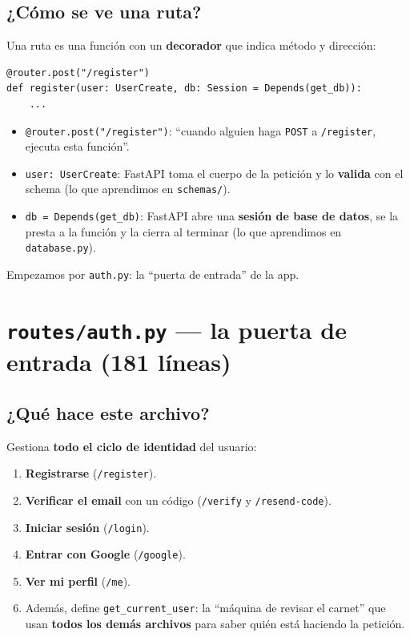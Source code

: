 \documentclass[11pt,a4paper]{article}
\begin{document}
\subsection{¿Cómo se ve una ruta?}

Una ruta es una función con un \textbf{decorador} que indica método y dirección:

\begin{lstlisting}
@router.post("/register")
def register(user: UserCreate, db: Session = Depends(get_db)):
    ...
\end{lstlisting}

\begin{itemize}
    \item \texttt{@router.post("/register")}: ``cuando alguien haga \texttt{POST} a
    \texttt{/register}, ejecuta esta función''.
    \item \texttt{user: UserCreate}: FastAPI toma el cuerpo de la petición y lo \textbf{valida}
    con el schema (lo que aprendimos en \texttt{schemas/}).
    \item \texttt{db = Depends(get\_db)}: FastAPI abre una \textbf{sesión de base de datos},
    se la presta a la función y la cierra al terminar (lo que aprendimos en \texttt{database.py}).
\end{itemize}

Empezamos por \texttt{auth.py}: la ``puerta de entrada'' de la app.

\section{\texttt{routes/auth.py} --- la puerta de entrada (181 líneas)}

\subsection{¿Qué hace este archivo?}

Gestiona \textbf{todo el ciclo de identidad} del usuario:
\begin{enumerate}
    \item \textbf{Registrarse} (\texttt{/register}).
    \item \textbf{Verificar el email} con un código (\texttt{/verify} y \texttt{/resend-code}).
    \item \textbf{Iniciar sesión} (\texttt{/login}).
    \item \textbf{Entrar con Google} (\texttt{/google}).
    \item \textbf{Ver mi perfil} (\texttt{/me}).
    \item Además, define \texttt{get\_current\_user}: la ``máquina de revisar el carnet'' que
    usan \textbf{todos los demás archivos} para saber quién está haciendo la petición.
\end{enumerate}
\end{document}

